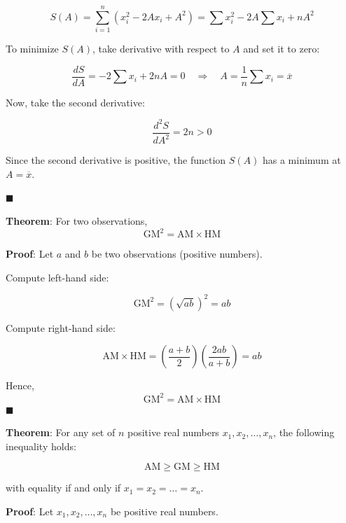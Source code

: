 \documentclass[twoside]{book}
\begin{document}
\[
S(A) = \sum_{i=1}^n (x_i^2 - 2Ax_i + A^2)
= \sum x_i^2 - 2A\sum x_i + nA^2
\]

To minimize \( S(A) \), take derivative with respect to \( A \) and set it to zero:

\[
\frac{dS}{dA} = -2\sum x_i + 2nA = 0 \quad \Rightarrow \quad A = \frac{1}{n} \sum x_i = \overline{x}
\]

Now, take the second derivative:

\[
\frac{d^2S}{dA^2} = 2n > 0
\]

Since the second derivative is positive, the function \( S(A) \) has a minimum at \( A = \overline{x} \).

\hfill $\blacksquare$

\begin{textbox}
\textbf{Theorem}: For two observations, \[ \text{GM}^2 = \text{AM} \times \text{HM} \]
\end{textbox}

\textbf{Proof}: Let \( a \) and \( b \) be two observations (positive numbers).

Compute left-hand side:

\[
\text{GM}^2 = (\sqrt{ab})^2 = ab
\]

Compute right-hand side:

\[
\text{AM} \times \text{HM} = \left( \frac{a + b}{2} \right) \left( \frac{2ab}{a + b} \right) = ab
\]

Hence, \[ \text{GM}^2 = \text{AM} \times \text{HM} \]
\hfill $\blacksquare$

\begin{textbox}
\textbf{Theorem}: For any set of \( n \) positive real numbers \( x_1, x_2, \dots, x_n \), the following inequality holds:

\[
\text{AM} \geq \text{GM} \geq \text{HM}
\]

with equality if and only if \( x_1 = x_2 = \dots = x_n \).
\end{textbox}

\textbf{Proof}: Let \( x_1, x_2, \dots, x_n \) be positive real numbers.
\end{document}
